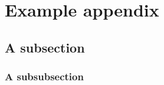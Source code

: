 \section{Example appendix}
\lipsum[1-2]
\subsection{A subsection}
\lipsum[1-2]
\subsubsection{A subsubsection}
\lipsum[1-2]